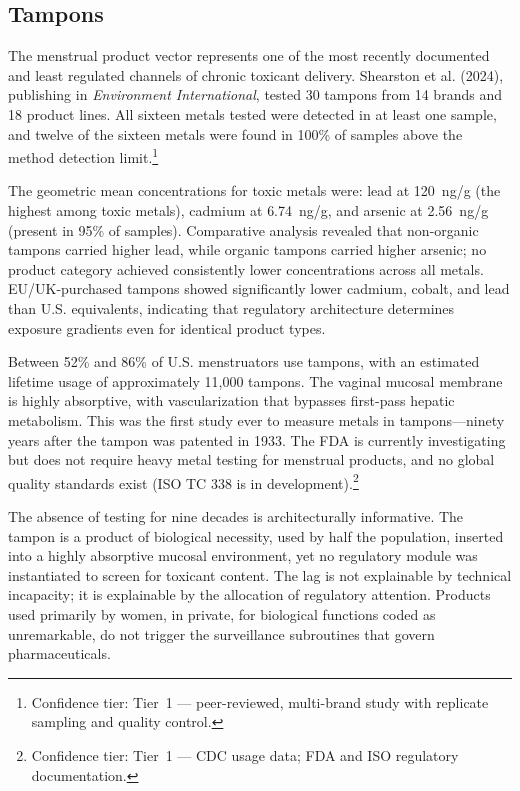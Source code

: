 \subsection{Tampons}

The menstrual product vector represents one of the most recently documented and
least regulated channels of chronic toxicant delivery. Shearston et al. (2024),
publishing in \textit{Environment International}, tested 30 tampons from 14
brands and 18 product lines. All sixteen metals tested were detected in at least
one sample, and twelve of the sixteen metals were found in 100\% of samples above
the method detection limit.\footnote{Confidence tier: Tier~1 --- peer-reviewed, multi-brand study with
replicate sampling and quality control.}

The geometric mean concentrations for toxic metals were: lead at 120~ng/g (the
highest among toxic metals), cadmium at 6.74~ng/g, and arsenic at 2.56~ng/g
(present in 95\% of samples). Comparative analysis revealed that non-organic tampons carried higher lead,
while organic tampons carried higher arsenic; no product category achieved
consistently lower concentrations across all metals. EU/UK-purchased tampons
showed significantly lower cadmium, cobalt, and lead than U.S. equivalents,
indicating that regulatory architecture determines exposure gradients even for
identical product types.

Between 52\% and 86\% of U.S. menstruators use tampons, with an estimated
lifetime usage of approximately 11,000 tampons. The vaginal mucosal membrane is
highly absorptive, with vascularization that bypasses first-pass hepatic
metabolism. This was the first study ever to measure metals in tampons---ninety
years after the tampon was patented in 1933. The FDA is currently investigating
but does not require heavy metal testing for menstrual products, and no global
quality standards exist (ISO TC 338 is in development).\footnote{Confidence
tier: Tier~1 --- CDC usage data; FDA and ISO regulatory documentation.}

The absence of testing for nine decades is architecturally informative. The
tampon is a product of biological necessity, used by half the population,
inserted into a highly absorptive mucosal environment, yet no regulatory module
was instantiated to screen for toxicant content. The lag is not explainable by
technical incapacity; it is explainable by the allocation of regulatory
attention. Products used primarily by women, in private, for biological
functions coded as unremarkable, do not trigger the surveillance subroutines
that govern pharmaceuticals.

